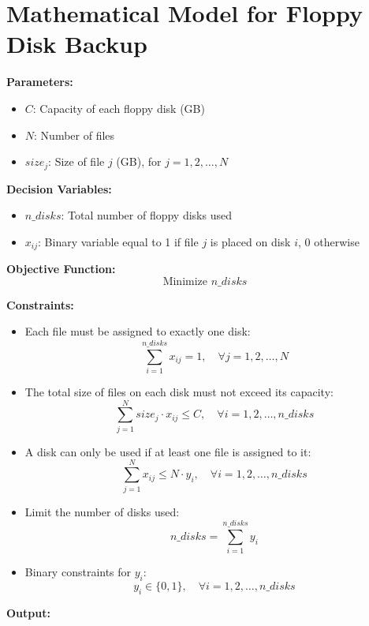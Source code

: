 \documentclass{article}
\begin{document}
\section*{Mathematical Model for Floppy Disk Backup}

\textbf{Parameters:}
\begin{itemize}
    \item $C$: Capacity of each floppy disk (GB)
    \item $N$: Number of files
    \item $size_j$: Size of file $j$ (GB), for $j = 1, 2, \ldots, N$
\end{itemize}

\textbf{Decision Variables:}
\begin{itemize}
    \item $n\_disks$: Total number of floppy disks used
    \item $x_{ij}$: Binary variable equal to 1 if file $j$ is placed on disk $i$, 0 otherwise
\end{itemize}

\textbf{Objective Function:}
\begin{equation}
\text{Minimize } n\_disks
\end{equation}

\textbf{Constraints:}
\begin{itemize}
    \item Each file must be assigned to exactly one disk:
    \begin{equation}
    \sum_{i=1}^{n\_disks} x_{ij} = 1, \quad \forall j = 1, 2, \ldots, N
    \end{equation}
    
    \item The total size of files on each disk must not exceed its capacity:
    \begin{equation}
    \sum_{j=1}^{N} size_j \cdot x_{ij} \leq C, \quad \forall i = 1, 2, \ldots, n\_disks
    \end{equation}
    
    \item A disk can only be used if at least one file is assigned to it:
    \begin{equation}
    \sum_{j=1}^{N} x_{ij} \leq N \cdot y_i, \quad \forall i = 1, 2, \ldots, n\_disks
    \end{equation}
    
    \item Limit the number of disks used:
    \begin{equation}
    n\_disks = \sum_{i=1}^{n\_disks} y_i
    \end{equation}
    
    \item Binary constraints for $y_i$:
    \begin{equation}
    y_i \in \{0, 1\}, \quad \forall i = 1, 2, \ldots, n\_disks
    \end{equation}
\end{itemize}

\textbf{Output:}
\end{document}
